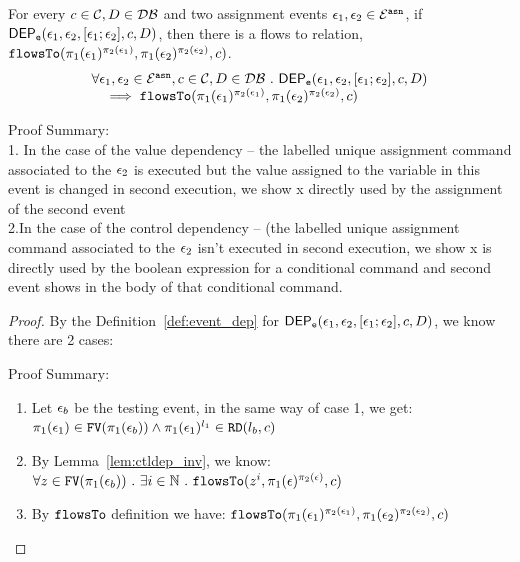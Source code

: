 \begin{lem}
	\label{lem:flowsto_soundness_emptytrace}
	For every $ c \in \mathcal{C}, D \in \mathcal{DB}$ and two assignment events $\mathtt{\epsilon}_1, \mathtt{\epsilon}_2 \in \mathcal{E}^{\mathtt{{asn}}}$,
	if $\mathsf{DEP_{\mathtt{e}}}(\mathtt{\epsilon}_1, \mathtt{\epsilon}_2, [\mathtt{\epsilon}_1; \mathtt{\epsilon}_2],  c, D) $,
	then there is a flows to relation, $\mathtt{flowsTo}(\pi_1(\mathtt{\epsilon}_1)^{\pi_2(\mathtt{\epsilon}_1)}, \pi_1(\mathtt{\epsilon}_2)^{\pi_2(\mathtt{\epsilon}_2)}, c)$.
	\[
	\begin{array}{l}
		\forall \mathtt{\epsilon}_1, \mathtt{\epsilon}_2 \in \mathcal{E}^{\mathtt{{asn}}}, c \in \mathcal{C}, D \in \mathcal{DB} 
		~.~  
		\mathsf{DEP_{\mathtt{e}}}(\mathtt{\epsilon}_1, \mathtt{\epsilon}_2, [\mathtt{\epsilon}_1; \mathtt{\epsilon}_2],  c, D) 
		\\ \quad 
		\implies 
		\mathtt{flowsTo}(\pi_1(\mathtt{\epsilon}_1)^{\pi_2(\mathtt{\epsilon}_1)}, \pi_1(\mathtt{\epsilon}_2)^{\pi_2(\mathtt{\epsilon}_2)}, c)
	\end{array}
	\]
\end{lem}
Proof Summary:
\\
1. In the case of the value dependency -- the labelled unique assignment command associated to the $\mathtt{\epsilon}_2$ 
is executed but the value assigned to the variable in this event is changed in second execution,
we show x directly used by the assignment of the second event
\\
2.In the case of the control dependency -- (the labelled unique assignment command associated to the $\mathtt{\epsilon}_2$ isn't executed in second execution,
we show x is directly used by the boolean expression for a conditional command and second event shows in the body of that conditional command.
%
\begin{proof}
	By the Definition~\ref{def:event_dep} for $\mathsf{DEP_{\mathtt{e}}}(\mathtt{\epsilon}_1, \mathtt{\epsilon}_2, [\mathtt{\epsilon}_1; \mathtt{\epsilon}_2], c, D)$, 
	we know there are 2 cases:

		Proof Summary:
		\begin{enumerate}
		\item Let $\mathtt{\epsilon}_b$ be the testing event,
		in the same way of case 1, we get:
		 $\pi_1(\mathtt{\epsilon}_1) \in \mathtt{FV}(\pi_1(\mathtt{\epsilon}_b)) 
		 \land 
		\pi_1(\mathtt{\epsilon}_1)^{l_1} \in \mathtt{RD}(l_b, c)$
		 \item By Lemma~\ref{lem:ctldep_inv}, we know:
		   $\forall z \in \mathtt{FV}(\pi_1(\mathtt{\epsilon}_b)) ~.~  \exists i \in \mathbb{N} ~.~ 
		 \mathtt{flowsTo}(z^i, \pi_1(\mathtt{\epsilon})^{\pi_2(\mathtt{\epsilon})}, c)$
		 \item By $\mathtt{flowsTo}$ definition we have:
		   $\mathtt{flowsTo}(\pi_1(\mathtt{\epsilon}_1)^{\pi_2(\mathtt{\epsilon}_1)}, \pi_1(\mathtt{\epsilon}_2)^{\pi_2(\mathtt{\epsilon}_2)}, c)$
		\end{enumerate}
		
\end{proof}
%